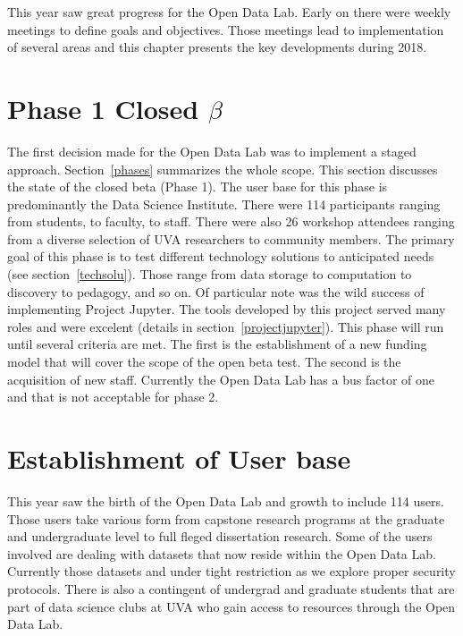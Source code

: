 This year saw great progress for the Open Data Lab. Early on there were weekly meetings to define goals and objectives. Those meetings lead to implementation of several areas and this chapter presents the key developments during 2018.

\section{Phase 1 Closed $\beta$}
The first decision made for the Open Data Lab was to implement a staged approach. Section~\ref{phases} summarizes the whole scope. This section discusses the state of the closed beta (Phase 1). The user base for this phase is predominantly the Data Science Institute. There were 114 participants ranging from students, to faculty, to staff. There were also 26 workshop attendees ranging from a diverse selection of UVA researchers to community members.
The primary goal of this phase is to test different technology solutions to anticipated needs (see section~\ref{techsolu}). Those range from data storage to computation to discovery to pedagogy, and so on. Of particular note was the wild success of implementing Project Jupyter. The tools developed by this project served many roles and were excelent (details in section~\ref{projectjupyter}).
This phase will run until several criteria are met. The first is the establishment of a new funding model that will cover the scope of the open beta test. The second is the acquisition of new staff. Currently the Open Data Lab has a bus factor of one and that is not acceptable for phase 2. 

\section{Establishment of User base}
This year saw the birth of the Open Data Lab and growth to include 114 users. Those users take various form from capstone research programs at the graduate and undergraduate level to full fleged dissertation research. Some of the users involved are dealing with datasets that now reside within the Open Data Lab. Currently those datasets and under tight restriction as we explore proper security protocols. There is also a contingent of undergrad and graduate students that are part of data science clubs at UVA who gain access to resources through the Open Data Lab.

